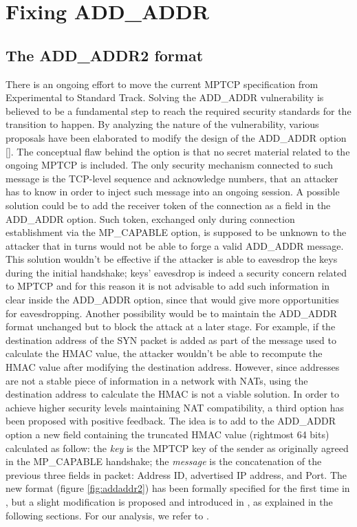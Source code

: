 \chapter{Fixing ADD\_ADDR}
\label{chap:addaddr2}

\section{The ADD\_ADDR2 format}
There is an ongoing effort to move the current MPTCP specification  from Experimental to Standard Track. Solving the ADD\_ADDR vulnerability is believed to be a fundamental step to reach the required security standards for the transition to happen.
By analyzing the nature of the vulnerability, various proposals have been elaborated to modify the design of the ADD\_ADDR option []. The conceptual flaw behind the option is that no secret material related to the ongoing MPTCP is included. The only security mechanism connected to such message is the TCP-level sequence and acknowledge numbers, that an attacker has to know in order to inject such message into an ongoing session.
A possible solution could be to add the receiver token of the connection as a field in the ADD\_ADDR option. Such token, exchanged only during connection establishment via the MP\_CAPABLE option, is supposed to be unknown to the attacker that in turns would not be able to forge a valid ADD\_ADDR message. This solution wouldn't be effective if the attacker is able to eavesdrop the keys during the initial handshake; keys' eavesdrop is indeed a security concern related to MPTCP and for this reason it is not advisable to add such information in clear inside the ADD\_ADDR option, since that would give more opportunities for eavesdropping.
Another possibility would be to maintain the ADD\_ADDR format unchanged but to block the attack at a later stage. For example, if the destination address of the SYN packet is added as part of the message used to calculate the HMAC value, the attacker wouldn't be able to recompute the HMAC value after modifying the destination address. However, since addresses are not a stable piece of information in a network with NATs, using the destination address to calculate the HMAC is not a viable solution.
In order to achieve higher security levels maintaining NAT compatibility, a third option has been proposed with positive feedback. The idea is to add to the ADD\_ADDR option a new field containing the truncated HMAC value (rightmost 64 bits) calculated as follow: the \textit{key} is the MPTCP key of the sender as originally agreed in the MP\_CAPABLE handshake; the \textit{message} is the concatenation of the previous three fields in packet: Address ID, advertised IP address, and Port. The new format (figure \ref{fig:addaddr2}) has been formally specified for the first time in , but a slight modification is proposed and introduced in , as explained in the following sections. For our analysis, we refer to .

